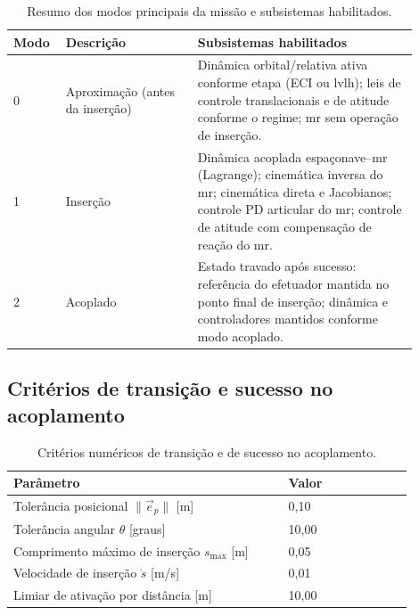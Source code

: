 \begin{table}[H]
\centering
\caption{Resumo dos modos principais da missão e subsistemas habilitados.}
\label{tab:apD_modos_missao}
\small
\begin{tabular}{|p{0.10\linewidth}|p{0.30\linewidth}|p{0.50\linewidth}|}
\hline
\textbf{Modo} & \textbf{Descrição} & \textbf{Subsistemas habilitados}\\
\hline
0 & Aproximação (antes da inserção) &
Dinâmica orbital/relativa ativa conforme etapa (ECI ou \gls{lvlh}); leis de controle translacionais e de atitude conforme o regime; \gls{mr} sem operação de inserção.\\
\hline
1 & Inserção &
Dinâmica acoplada espaçonave--\gls{mr} (Lagrange); cinemática inversa do \gls{mr}; cinemática direta e Jacobianos; controle PD articular do \gls{mr}; controle de atitude com compensação de reação do \gls{mr}.\\
\hline
2 & Acoplado &
Estado travado após sucesso: referência do efetuador mantida no ponto final de inserção; dinâmica e controladores mantidos conforme modo acoplado.\\
\hline
\end{tabular}
\end{table}

\subsection{Critérios de transição e sucesso no acoplamento}
\label{apD:criterios_transicao_docking}

\begin{table}[H]
\centering
\caption{Critérios numéricos de transição e de sucesso no acoplamento.}
\label{tab:apD_criterios_docking}
\begin{tabular}{|p{0.62\linewidth}|p{0.28\linewidth}|}
\hline
\textbf{Parâmetro} & \textbf{Valor}\\
\hline
Tolerância posicional $\|\vec{e}_p\|$ [m] & 0,10\\
\hline
Tolerância angular $\theta$ [graus] & 10,00\\
\hline
Comprimento máximo de inserção $s_{\max}$ [m] & 0,05\\
\hline
Velocidade de inserção $\dot{s}$ [m/s] & 0,01\\
\hline
Limiar de ativação por distância [m] & 10,00\\
\hline
\end{tabular}
\end{table}

